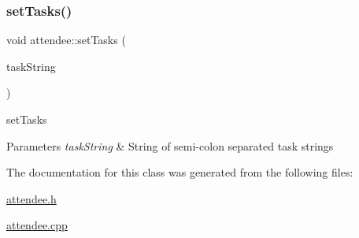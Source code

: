 \subsubsection{\texorpdfstring{set\+Tasks()}{setTasks()}}
{\footnotesize\ttfamily void attendee\+::set\+Tasks (\begin{DoxyParamCaption}\item[{Q\+String}]{task\+String }\end{DoxyParamCaption})}



set\+Tasks 


\begin{DoxyParams}{Parameters}
{\em task\+String} & String of semi-\/colon separated task strings \\
\hline
\end{DoxyParams}


The documentation for this class was generated from the following files\+:\begin{DoxyCompactItemize}
\item 
\hyperlink{attendee_8h}{attendee.\+h}\item 
\hyperlink{attendee_8cpp}{attendee.\+cpp}\end{DoxyCompactItemize}
